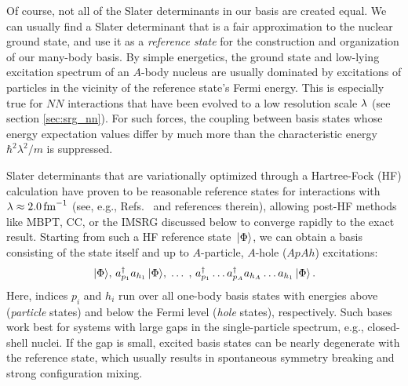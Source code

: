 {Of course, not all of the Slater determinants in our basis are created equal. 
We can usually find a Slater determinant that is a fair approximation 
to the nuclear ground state, and use it as a \emph{reference state} for the 
construction and organization of our many-body basis. By simple energetics, the 
ground state and low-lying excitation spectrum of an $A$-body nucleus are usually 
dominated by excitations of particles in the vicinity of the reference state's 
Fermi energy. This is especially true for $NN$ interactions that have
been evolved to a low resolution scale $\lambda$ (see section 
\ref{sec:srg_nn}). For such forces, the coupling between basis states whose
energy expectation values differ by much more than the characteristic energy 
$\hbar^2\lambda^2/m$ is suppressed. 

Slater determinants that are variationally optimized through a Hartree-Fock 
(HF) calculation have proven to be reasonable reference states for interactions 
with $\lambda\approx2.0\,\text{fm}^{-1}$ (see, e.g., Refs.~\cite{Bogner:2010pq,Roth:2010vp,Barrett:2013oq,Hagen:2014ve,Hergert:2016jk,Tichai:2016vl} and references therein), allowing post-HF methods like MBPT, 
CC, or the IMSRG discussed below to converge rapidly to the exact result. 
Starting from such a HF reference state $\,|{\Phi}\rangle$, we can obtain 
a basis consisting of the state itself and up to $A$-particle, $A$-hole ($ApAh$) 
excitations:
\begin{equation}
  \,|{\Phi}\rangle,\,a^\dag_{p_1}a_{h_1}\,|{\Phi}\rangle,\;\ldots\;,\,a^\dag_{p_1}\ldots a^\dag_{p_A}a_{h_A}\ldots a_{h_1}\,|{\Phi}\rangle\,.
\end{equation}
Here, indices $p_i$ and $h_i$ run over all one-body basis states with energies above 
(\emph{particle} states) and below the Fermi level (\emph{hole} states), respectively.
Such bases work best for systems with large gaps in the single-particle 
spectrum, e.g., closed-shell nuclei. If the gap is small, excited basis 
states can be nearly degenerate with the reference state, which usually 
results in spontaneous symmetry breaking and strong configuration mixing.

}
